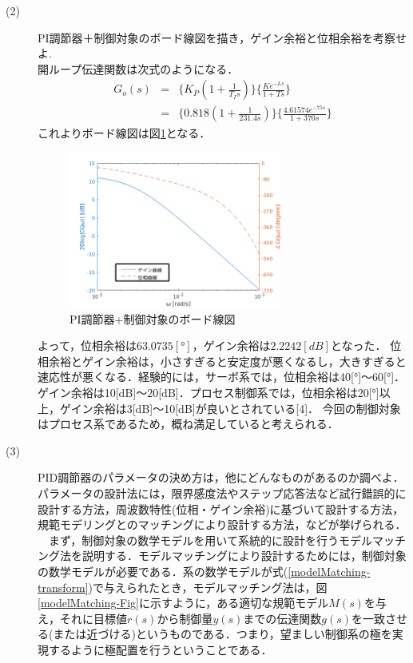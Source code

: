 \documentclass[12pt]{jsarticle}
\begin{document}
\begin{description}
\item[(2)]PI調節器＋制御対象のボード線図を描き，ゲイン余裕と位相余裕を考察せよ.\\
開ループ伝達関数は次式のようになる．
\begin{eqnarray}
  \label{PID_openG}
  G_o(s) &=& \{K_P(1+\frac{1}{T_Is})\}\{\frac{Ke^{-Ls}}{1+Ts}\} \\
  &=& \{0.818(1+\frac{1}{231.4s})\}\{\frac{4.61574e^{-75s}}{1+370s}\} \nonumber
\end{eqnarray}
これよりボード線図は図\ref{BodeChart_PID}となる．
\begin{figure}[tb]
  \begin{center}
    \includegraphics[clip,width=7.0cm]{../graph/BodeChart_PID.png}
    \caption{PI調節器+制御対象のボード線図}
    \label{BodeChart_PID}
  \end{center}
\end{figure}
よって，位相余裕は$63.0735[°]$，ゲイン余裕は$2.2242[dB]$となった．
位相余裕とゲイン余裕は，小さすぎると安定度が悪くなるし，大きすぎると速応性が悪くなる．経験的には，サーボ系では，位相余裕は40[°]〜60[°]．ゲイン余裕は10[dB]〜20[dB]．プロセス制御系では，位相余裕は20[°]以上，ゲイン余裕は3[dB]〜10[dB]が良いとされている[4]．%
今回の制御対象はプロセス系であるため，概ね満足していると考えられる．
\item[(3)]PID調節器のパラメータの決め方は，他にどんなものがあるのか調べよ．\\
パラメータの設計法には，限界感度法やステップ応答法など試行錯誤的に設計する方法，周波数特性(位相・ゲイン余裕)に基づいて設計する方法，規範モデリングとのマッチングにより設計する方法，などが挙げられる．\\
　まず，制御対象の数学モデルを用いて系統的に設計を行うモデルマッチング法を説明する．モデルマッチングにより設計するためには，制御対象の数学モデルが必要である．系の数学モデルが式(\ref{modelMatching-transform})で与えられたとき，モデルマッチング法は，図\ref{modelMatching-Fig}に示すように，ある適切な規範モデル$M(s)$を与え，それに目標値$r(s)$から制御量$y(s)$までの伝達関数$g(s)$を一致させる(または近づける)というものである．つまり，望ましい制御系の極を実現するように極配置を行うということである．\\

\end{description}
\end{document}

